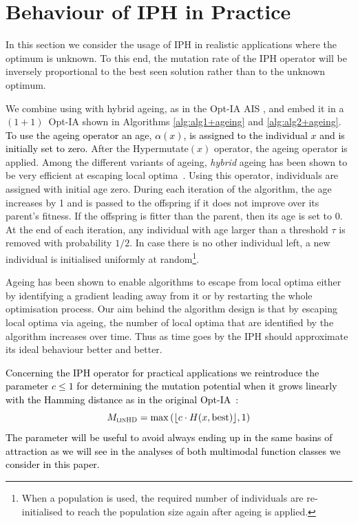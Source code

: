 \documentclass[lettersize,journal]{IEEEtran}
\newcommand{\new}[1]{\textcolor{black}{#1}}
\begin{document}
 	
 	\section{Behaviour of IPH in Practice}

In this section we consider the usage of IPH %
in realistic applications where the optimum is unknown.
 To this end, the mutation rate of the IPH operator will be inversely proportional to the best seen solution rather than to the unknown optimum. 
 
 We combine \IPHfcm{} using {\linHD } with hybrid ageing, as in the Opt-IA AIS \cite{CutelloNicosiaPavoneTimmis2007}, and embed it in a $(1+1)$~Opt-IA shown in Algorithms \ref{alg:alg1+ageing} and \ref{alg:alg2+ageing}. \new{To use the ageing operator an age, $\alpha(x)$, is assigned to the individual $x$ and is initially set to zero.} After the Hypermutate$(x)$ operator, %
 	the ageing operator is applied.
 	Among the different variants of ageing, {\it hybrid} ageing has been shown to be very efficient at escaping local optima~\cite{OlivetoSudholt2014ageing,CorusOlivetoYazdaniGECCO2017,CorusOlivetoYazdaniPPSN2018Approx}. Using this operator,  individuals are assigned with initial age zero. During each iteration of the algorithm, the age  increases by 1 and is passed to the offspring if it does not improve over its parent's fitness. If the offspring is fitter than the parent, then its age is set to 0. At the end of each iteration, any individual with age larger than a threshold $\tau$ is removed with probability $1/2$. In case there is no other individual left, a new individual is initialised uniformly at random\footnote{When a population is used, the required number of individuals are re-initialised to reach the population size again after ageing is applied.}. 
 
 Ageing has been shown to enable algorithms to escape from local optima either by identifying a gradient leading away from it or by restarting the whole optimisation process. Our aim behind the algorithm design is that by escaping local optima via ageing, the number of local optima that are identified by the algorithm increases over time. Thus as time goes by the IPH should approximate its ideal behaviour better and better.
 
 \textcolor{black}{Concerning the IPH operator for practical applications we  reintroduce the parameter $c\leq 1$ for determining the mutation potential when it grows linearly with the Hamming distance as in the original Opt-IA~\cite{JansenZarges2011}:}  
 \textcolor{black}{
 $$M_\textsc{linHD} = \max\left(\lfloor c \cdot H(x,\text{best}) \rfloor, 1 \right) $$
 }
\textcolor{black}{The parameter will be useful to avoid always ending up in the same basins of attraction as we will see in the analyses of both multimodal function classes we consider in this paper.} %
\end{document}
